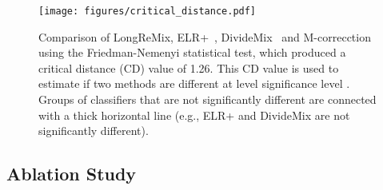 \documentclass[review]{elsarticle}
\begin{document}
\begin{figure}[!t]
\centering
\texttt{[image: figures/critical\_distance.pdf]}
\caption{Comparison of  LongReMix, ELR+~\cite{liu2020early}, DivideMix~\cite{li2020dividemix} and M-correcction~\cite{arazo2019unsupervised} using the Friedman-Nemenyi statistical test, which produced a critical distance (CD) value of 1.26. 
This CD value is used to estimate if two methods are  different at level significance level . 
Groups of classifiers that are not significantly different are connected with a thick horizontal line (e.g., ELR+ and DivideMix are not significantly different).}
\label{fig:critical_distance}
\end{figure}

\subsection{Ablation Study}
\end{document}
